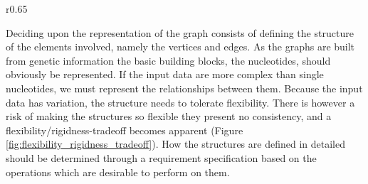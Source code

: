\documentclass[thesis.tex]{subfiles}
\begin{document}
\begin{wrapfigure}{r}{0.65\textwidth}
\begin{mdframed}
\begin{subfigure}[t]{\textwidth}
\begin{mdframed}
\begin{center}
        \end{center}
      \end{mdframed}
      \captionsetup{skip=-8pt}
    \end{subfigure}
  \end{mdframed}
  \vspace*{-5mm}
  \caption{Two propsed graph models displaying flexibility (a) and rigidity (b)}
  \label{fig:flexibility_rigidness_tradeoff}
\end{wrapfigure}
Deciding upon the representation of the graph consists of defining the structure of the elements involved, namely the vertices and edges. As the graphs are built from genetic information the basic building blocks, the nucleotides, should obviously be represented. If the input data are more complex than single nucleotides, we must represent the relationships between them. Because the input data has variation, the structure needs to tolerate flexibility. There is however a risk of making the structures so flexible they present no consistency, and a flexibility/rigidness-tradeoff becomes apparent (Figure \ref{fig:flexibility_rigidness_tradeoff}). How the structures are defined in detailed should be determined through a requirement specification based on the operations which are desirable to perform on them.
\end{document}

